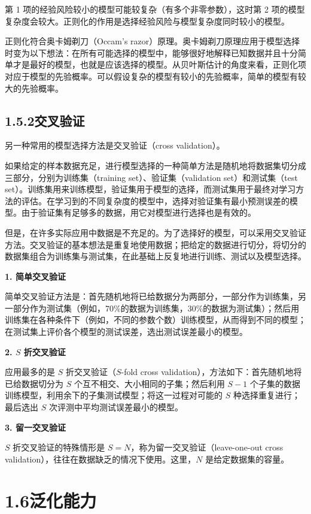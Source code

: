 \documentclass[UTF8, 12pt, fontset=fandol, oneside]{ctexart}
\begin{document}
第 1 项的经验风险较小的模型可能较复杂（有多个非零参数），这时第 2 项的模型复杂度会较大。正则化的作用是选择经验风险与模型复杂度同时较小的模型。

正则化符合奥卡姆剃刀（Occam's razor）原理。奥卡姆剃刀原理应用于模型选择时变为以下想法：在所有可能选择的模型中，能够很好地解释已知数据并且十分简单才是最好的模型，也就是应该选择的模型。从贝叶斯估计的角度来看，正则化项对应于模型的先验概率。可以假设复杂的模型有较小的先验概率，简单的模型有较大的先验概率。

\subsection*{1.5.2\quad 交叉验证}

另一种常用的模型选择方法是交叉验证（cross validation）。

如果给定的样本数据充足，进行模型选择的一种简单方法是随机地将数据集切分成三部分，分别为训练集（training set）、验证集（validation set）和测试集（test set）。训练集用来训练模型，验证集用于模型的选择，而测试集用于最终对学习方法的评估。在学习到的不同复杂度的模型中，选择对验证集有最小预测误差的模型。由于验证集有足够多的数据，用它对模型进行选择也是有效的。

但是，在许多实际应用中数据是不充足的。为了选择好的模型，可以采用交叉验证方法。交叉验证的基本想法是重复地使用数据；把给定的数据进行切分，将切分的数据集组合为训练集与测试集，在此基础上反复地进行训练、测试以及模型选择。

\noindent\textbf{1. 简单交叉验证}

简单交叉验证方法是：首先随机地将已给数据分为两部分，一部分作为训练集，另一部分作为测试集（例如，70\%的数据为训练集，30\%的数据为测试集）；然后用训练集在各种条件下（例如，不同的参数个数）训练模型，从而得到不同的模型；在测试集上评价各个模型的测试误差，选出测试误差最小的模型。

\noindent\textbf{2. $S$ 折交叉验证}

应用最多的是 $S$ 折交叉验证（$S$-fold cross validation），方法如下：首先随机地将已给数据切分为 $S$ 个互不相交、大小相同的子集；然后利用 $S-1$ 个子集的数据训练模型，利用余下的子集测试模型；将这一过程对可能的 $S$ 种选择重复进行；最后选出 $S$ 次评测中平均测试误差最小的模型。

\noindent\textbf{3. 留一交叉验证}

$S$ 折交叉验证的特殊情形是 $S=N$，称为留一交叉验证（leave-one-out cross validation），往往在数据缺乏的情况下使用。这里，$N$ 是给定数据集的容量。

\section*{1.6\quad 泛化能力}
\end{document}
